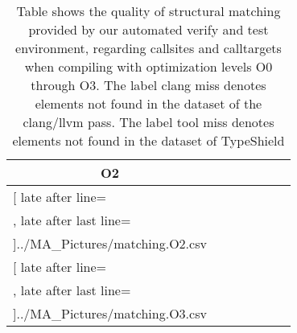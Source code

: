 \begin{table}
{\begin{tabular}{l|c|c|c|c|c|c}
	\multicolumn{1}{c}{\bfseries O2}%
	\\\midrule
	\csvreader[ late after line=\\, late after last line=\\\midrule]{../MA_Pictures/matching.O2.csv}{
	}
	{\csvcoli & \csvcoliii & \csvcoliv & \csvcolv & \csvcolix & \csvcolx & \csvcolxi }%
%
%

	\multicolumn{1}{c}{\bfseries O3 }%
	\\\midrule
	\csvreader[ late after line=\\, late after last line=\\\bottomrule]{../MA_Pictures/matching.O3.csv}{
	}
	{\csvcoli & \csvcoliii & \csvcoliv & \csvcolv & \csvcolix & \csvcolx & \csvcolxi }%
    	\end{tabular}
}
		\caption {Table shows the quality of structural matching provided by our automated verify and test environment, regarding callsites and calltargets when compiling with optimization levels O0 through O3. The label clang miss denotes elements not found in the dataset of the clang/llvm pass. The label tool miss denotes elements not found in the dataset of TypeShield}
	\label{tbl:matchingquality}
\end{table}



